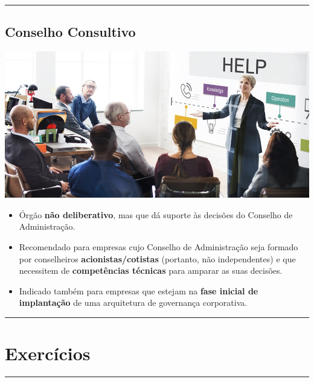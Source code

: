 \documentclass[
]{book}
\providecommand{\tightlist}{%
  \setlength{\itemsep}{0pt}\setlength{\parskip}{0pt}}
\begin{document}
\begin{center}\rule{0.5\linewidth}{0.5pt}\end{center}

\subsection{Conselho Consultivo}\label{conselho-consultivo}

\includegraphics[width=8.30208in,height=\textheight]{images/04-2025-08-26_27/03-conselho_consultivo.jpg}

\begin{itemize}
\tightlist
\item
  Órgão \textbf{não deliberativo}, mas que dá suporte às decisões do Conselho de Administração.
\item
  Recomendado para empresas cujo Conselho de Administração seja formado por conselheiros \textbf{acionistas/cotistas} (portanto, não independentes) e que necessitem de \textbf{competências técnicas} para amparar as suas decisões.
\item
  Indicado também para empresas que estejam na \textbf{fase inicial de implantação} de uma arquitetura de governança corporativa.
\end{itemize}

\begin{center}\rule{0.5\linewidth}{0.5pt}\end{center}

\section{Exercícios}\label{exercuxedcios-2}

\begin{center}\rule{0.5\linewidth}{0.5pt}\end{center}
\end{document}

